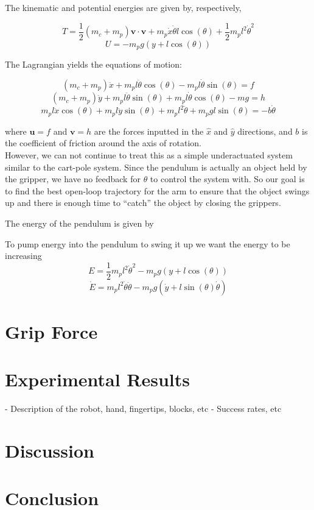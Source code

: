 \documentclass{article}
\begin{document}
The kinematic and potential energies are given by, respectively, 

\begin{equation}\label{eq:kinetic}
T = \frac{1}{2} (m_c + m_p) \mathbf{v} \cdot \mathbf{v} + m_p\dot{x}\dot{\theta}l\cos(\theta) + \frac{1}{2}m_pl^2\dot{\theta}^2
\end{equation}
\begin{equation}\label{eq:potential}
U = -m_pg(y+l\cos(\theta))
\end{equation}

The Lagrangian yields the equations of motion:

\begin{equation}\label{eq:x_motion}
(m_c+m_p)\ddot{x} + m_pl\ddot{\theta}\cos(\theta) - m_pl\dot{\theta}\sin(\theta) = f
\end{equation}
\begin{equation}\label{eq:y_motion}
(m_c+m_p)\ddot{y} + m_pl\ddot{\theta}\sin(\theta) + m_pl\dot{\theta}\cos(\theta) - mg = h
\end{equation}
\begin{equation}\label{eq:theta_motion}
m_pl\ddot{x}\cos(\theta) + m_pl\ddot{y}\sin(\theta) + m_pl^2\ddot{\theta} + m_pgl\sin(\theta) = -b\dot{\theta}
\end{equation}

where $\mathbf{u} = f$ and $\mathbf{v} = h$ are the forces inputted in the $\hat{x}$ and $\hat{y}$ directions, and $b$ is the coefficient of friction around the axis of rotation. \\

However, we can not continue to treat this as a simple underactuated
system similar to the cart-pole system. Since the pendulum is actually
an object held by the gripper, we have no feedback for $\theta$ to
control the system with. So our goal is to find the best open-loop
trajectory for the arm to ensure that the object swings up and there
is enough time to ``catch'' the object by closing the grippers.


The energy of the pendulum is given by 

To pump energy into the pendulum to swing it up we want the energy to be increasing
\begin{equation}\label{eq:pendE}
E = \frac{1}{2}m_pl^2\dot{\theta}^2 - m_pg(y+l\cos(\theta))
\end{equation}
\begin{equation}\label{eq:pendEdot}
\dot{E} = m_pl^2\dot{\theta}\ddot{\theta} - m_pg(\dot{y}+l\sin(\theta)\dot{\theta})
\end{equation}

\section{Grip Force}

\section{Experimental Results}

- Description of the robot, hand, fingertips, blocks, etc
- Success rates, etc

\section{Discussion}

\section{Conclusion}
\end{document}
